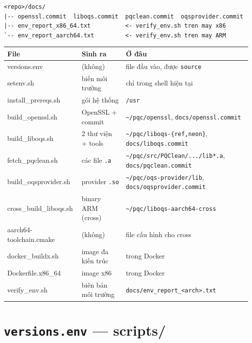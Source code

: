 \documentclass[11pt,a4paper]{article}
\begin{document}
\begin{lstlisting}
<repo>/docs/
|-- openssl.commit  liboqs.commit  pqclean.commit  oqsprovider.commit
|-- env_report_x86_64.txt          <- verify_env.sh tren may x86
`-- env_report_aarch64.txt         <- verify_env.sh tren may ARM
\end{lstlisting}

\begin{center}\small
\begin{tabularx}{\linewidth}{@{}l l X@{}}
\toprule
\textbf{File} & \textbf{Sinh ra} & \textbf{Ở đâu} \\
\midrule
versions.env & (không) & file đầu vào, được \texttt{source} \\
setenv.sh & biến môi trường & chỉ trong shell hiện tại \\
install\_prereqs.sh & gói hệ thống & \texttt{/usr} \\
build\_openssl.sh & OpenSSL + commit & \texttt{\textasciitilde/pqc/openssl}, \texttt{docs/openssl.commit} \\
build\_liboqs.sh & 2 thư viện + tools & \texttt{\textasciitilde/pqc/liboqs-\{ref,neon\}}, \texttt{docs/liboqs.commit} \\
fetch\_pqclean.sh & các file \texttt{.a} & \texttt{\textasciitilde/pqc/src/PQClean/.../lib*.a}, \texttt{docs/pqclean.commit} \\
build\_oqsprovider.sh & provider \texttt{.so} & \texttt{\textasciitilde/pqc/oqs-provider/lib}, \texttt{docs/oqsprovider.commit} \\
cross\_build\_liboqs.sh & binary ARM (cross) & \texttt{\textasciitilde/pqc/liboqs-aarch64-cross} \\
aarch64-toolchain.cmake & (không) & file cấu hình cho cross \\
docker\_buildx.sh & image đa kiến trúc & trong Docker \\
Dockerfile.x86\_64 & image x86 & trong Docker \\
verify\_env.sh & biên bản môi trường & \texttt{docs/env\_report\_<arch>.txt} \\
\bottomrule
\end{tabularx}
\end{center}

\section{\texttt{versions.env} — \textmd{\normalsize scripts/}}
\end{document}
